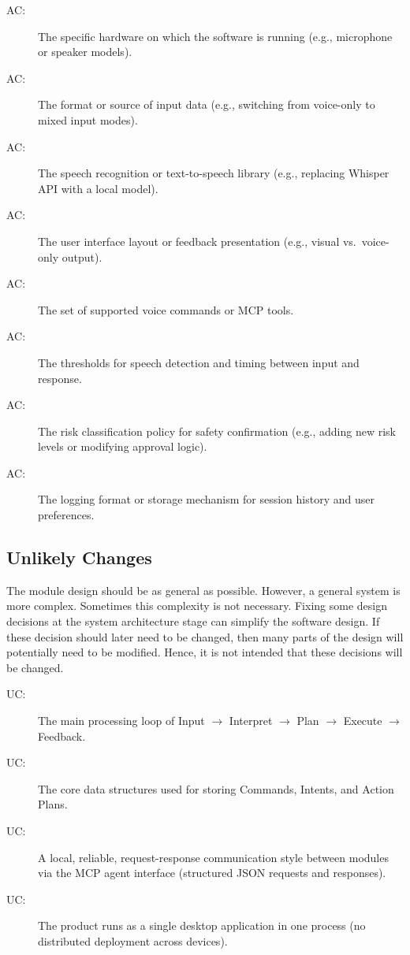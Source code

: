 \documentclass[12pt, titlepage]{article}
\newcounter{acnum}
\newcommand{\actheacnum}{AC\theacnum}
\newcounter{ucnum}
\newcommand{\uctheucnum}{UC\theucnum}
\begin{document}
\begin{description}
\item[ \actheacnum \label{acHardware}:]
The specific hardware on which the software is running (e.g., microphone or
speaker models).
\item[ \actheacnum \label{acInput}:]
The format or source of input data (e.g., switching from voice-only to mixed
input modes).
\item[ \actheacnum \label{acSTT}:]
The speech recognition or text-to-speech library (e.g., replacing Whisper API
with a local model).
\item[ \actheacnum \label{acUI}:]
The user interface layout or feedback presentation (e.g., visual vs.\ voice-only
output).
\item[ \actheacnum \label{acCommands}:]
The set of supported voice commands or MCP tools.
\item[ \actheacnum \label{acThresholds}:]
The thresholds for speech detection and timing between input and response.
\item[ \actheacnum \label{acSafety}:]
The risk classification policy for safety confirmation (e.g., adding new risk
levels or modifying approval logic).
\item[ \actheacnum \label{acStorage}:]
The logging format or storage mechanism for session history and user
preferences.
\end{description}

\subsection{Unlikely Changes} \label{SecUchange}

The module design should be as general as possible. However, a general system is
more complex. Sometimes this complexity is not necessary. Fixing some design
decisions at the system architecture stage can simplify the software design. If
these decision should later need to be changed, then many parts of the design
will potentially need to be modified. Hence, it is not intended that these
decisions will be changed.

\begin{description}
\item[ \uctheucnum \label{ucPipeline}:]
The main processing loop of Input $\rightarrow$ Interpret $\rightarrow$ Plan
$\rightarrow$ Execute $\rightarrow$ Feedback.
\item[ \uctheucnum \label{ucDataStructures}:]
The core data structures used for storing Commands, Intents, and Action Plans.
\item[ \uctheucnum \label{ucMCP}:]
A local, reliable, request-response communication style between modules via the
MCP agent interface (structured JSON requests and responses).
\item[ \uctheucnum \label{ucDeployment}:]
The product runs as a single desktop application in one process (no distributed
deployment across devices).
\end{description}
\end{document}

